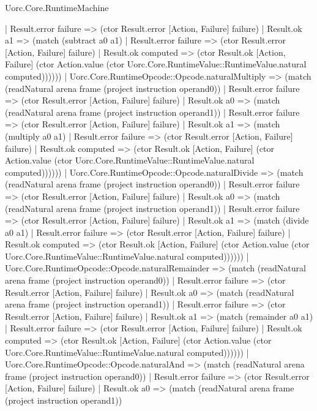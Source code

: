 \begin{lexlean}{Uorc.Core.RuntimeMachine}
\begin{semanticmodule}
{        | Result.error failure => (ctor Result.error [Action, Failure] failure)
        | Result.ok a1 => (match (subtract a0 a1)
          | Result.error failure => (ctor Result.error [Action, Failure] failure)
          | Result.ok computed => (ctor Result.ok [Action, Failure] (ctor Action.value (ctor Uorc.Core.RuntimeValue::RuntimeValue.natural computed))))))
    | Uorc.Core.RuntimeOpcode::Opcode.naturalMultiply => (match (readNatural arena frame (project instruction operand0))
      | Result.error failure => (ctor Result.error [Action, Failure] failure)
      | Result.ok a0 => (match (readNatural arena frame (project instruction operand1))
        | Result.error failure => (ctor Result.error [Action, Failure] failure)
        | Result.ok a1 => (match (multiply a0 a1)
          | Result.error failure => (ctor Result.error [Action, Failure] failure)
          | Result.ok computed => (ctor Result.ok [Action, Failure] (ctor Action.value (ctor Uorc.Core.RuntimeValue::RuntimeValue.natural computed))))))
    | Uorc.Core.RuntimeOpcode::Opcode.naturalDivide => (match (readNatural arena frame (project instruction operand0))
      | Result.error failure => (ctor Result.error [Action, Failure] failure)
      | Result.ok a0 => (match (readNatural arena frame (project instruction operand1))
        | Result.error failure => (ctor Result.error [Action, Failure] failure)
        | Result.ok a1 => (match (divide a0 a1)
          | Result.error failure => (ctor Result.error [Action, Failure] failure)
          | Result.ok computed => (ctor Result.ok [Action, Failure] (ctor Action.value (ctor Uorc.Core.RuntimeValue::RuntimeValue.natural computed))))))
    | Uorc.Core.RuntimeOpcode::Opcode.naturalRemainder => (match (readNatural arena frame (project instruction operand0))
      | Result.error failure => (ctor Result.error [Action, Failure] failure)
      | Result.ok a0 => (match (readNatural arena frame (project instruction operand1))
        | Result.error failure => (ctor Result.error [Action, Failure] failure)
        | Result.ok a1 => (match (remainder a0 a1)
          | Result.error failure => (ctor Result.error [Action, Failure] failure)
          | Result.ok computed => (ctor Result.ok [Action, Failure] (ctor Action.value (ctor Uorc.Core.RuntimeValue::RuntimeValue.natural computed))))))
    | Uorc.Core.RuntimeOpcode::Opcode.naturalAnd => (match (readNatural arena frame (project instruction operand0))
      | Result.error failure => (ctor Result.error [Action, Failure] failure)
      | Result.ok a0 => (match (readNatural arena frame (project instruction operand1))
}
\end{semanticmodule}
\end{lexlean}
